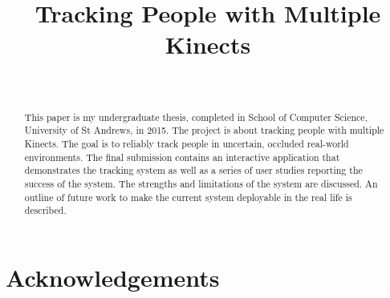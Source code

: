 \documentclass{sigchi}
\begin{document}
\title{Tracking People with Multiple Kinects}

\author{%
  \\
}

\maketitle

\begin{abstract}
This paper is my undergraduate thesis, completed in School of Computer Science, University of St Andrews, in 2015. The project is about tracking people with multiple Kinects. The goal is to reliably track people in uncertain, occluded real-world environments. The final submission contains an interactive application that demonstrates the tracking system as well as a series of user studies reporting the success of the system. The strengths and limitations of the system are discussed. An outline of future work to make the current system deployable in the real life is described.

\end{abstract}



























\newpage
\section{Acknowledgements}
\label{sec:acknowledge}
\end{document}
